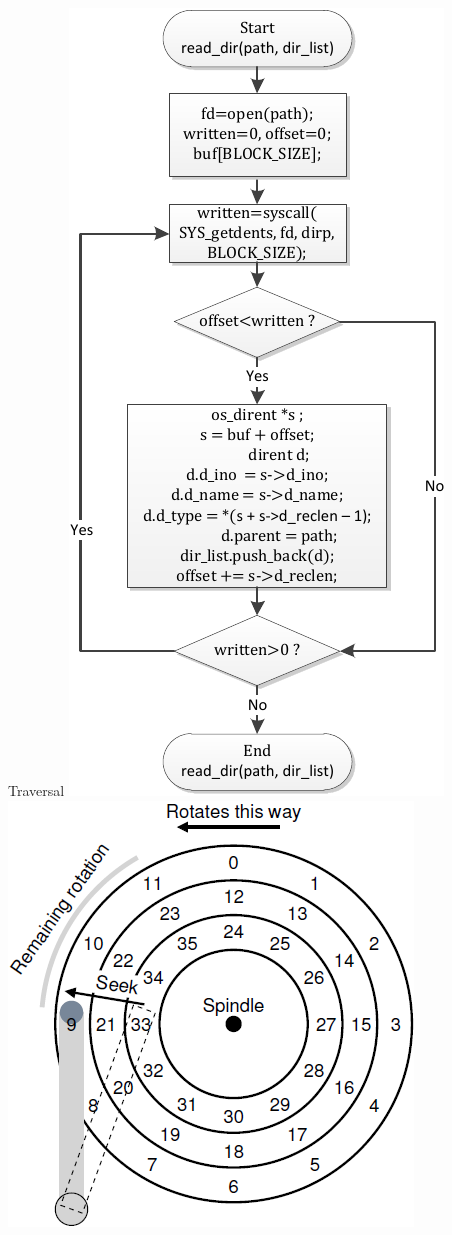 \documentclass{beamer}
\begin{document}
\begin{frame}{Traversal}
\includegraphics[scale=0.38]{fig/read_dir.pdf}\hspace*{0.1cm}
\includegraphics[scale=0.3]{fig/seek_rotate.png}
\end{frame}
\end{document}
